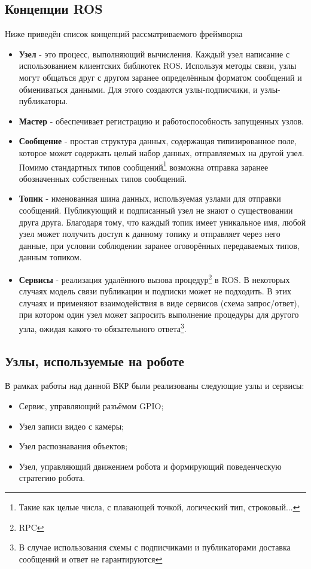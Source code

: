 \subsection{Концепции ROS}
Ниже приведён список концепций рассматриваемого фреймворка
\begin{itemize}
\item {\textbf{Узел} - это процесс, выполняющий вычисления. Каждый узел написание с использованием клиентских библиотек ROS. Используя методы связи, узлы могут общаться друг с другом заранее определённым форматом сообщений и обмениваться данными. Для этого создаются узлы-подписчики, и узлы-публикаторы.}
\item {\textbf{Мастер} - обеспечивает регистрацию и работоспособность запущенных узлов.}
\item {\textbf{Сообщение} - простая структура данных, содержащая типизированное поле, которое может содержать целый набор данных, отправляемых на другой узел. Помимо стандартных типов сообщений\footnote{Такие как целые числа, с плавающей точкой, логический тип, строковый...} возможна отправка заранее обозначенных собственных типов сообщений.}
\item {\textbf{Топик} - именованная шина данных, используемая узлами для отправки сообщений. Публикующий и подписанный узел не знают о существовании друга друга. Благодаря тому, что каждый топик имеет уникальное имя, любой узел может получить доступ к данному топику и отправляет через него данные, при условии соблюдении заранее оговорённых передаваемых типов, данным топиком.}
\item {\textbf{Сервисы} - реализация удалённого вызова процедур\footnote{RPC} в ROS. В некоторых случаях модель связи публикации и подписки может не подходить. В этих случаях и применяют взаимодействия в виде сервисов (схема запрос/ответ), при котором один узел может запросить выполнение процедуры для другого узла, ожидая какого-то обязательного ответа\footnote{В случае использования схемы с подписчиками и публикаторами доставка сообщений и ответ не гарантируются}\cite[с. 20]{joseph2018mastering}.}
\end{itemize}

\subsection{Узлы, используемые на роботе}
В рамках работы над данной ВКР были реализованы следующие узлы и сервисы:
\begin{itemize}
\item Сервис, управляющий разъёмом GPIO; 
\item Узел записи видео с камеры;
\item Узел распознавания объектов;
\item Узел, управляющий движением робота и формирующий поведенческую стратегию робота.
\end{itemize}

